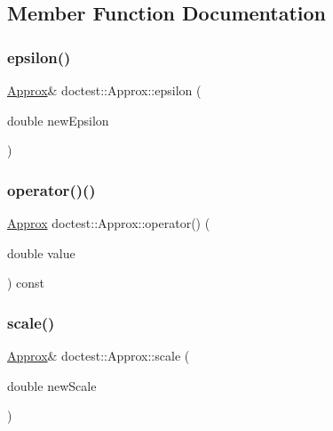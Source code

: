\subsection{Member Function Documentation}
\mbox{\label{classdoctest_1_1Approx_af8df6b0af00fd875e5b6a0c30b86f636}} 
\subsubsection{\texorpdfstring{epsilon()}{epsilon()}}
{\footnotesize\ttfamily \hyperlink{classdoctest_1_1Approx}{Approx}\& doctest\+::\+Approx\+::epsilon (\begin{DoxyParamCaption}\item[{double}]{new\+Epsilon }\end{DoxyParamCaption})}

\mbox{\label{classdoctest_1_1Approx_aae907c5ea1c4ac94e134db9e35da7dce}} 
\subsubsection{\texorpdfstring{operator()()}{operator()()}}
{\footnotesize\ttfamily \hyperlink{classdoctest_1_1Approx}{Approx} doctest\+::\+Approx\+::operator() (\begin{DoxyParamCaption}\item[{double}]{value }\end{DoxyParamCaption}) const}

\mbox{\label{classdoctest_1_1Approx_a62185fd4c09a63dab61bd893574d8473}} 
\subsubsection{\texorpdfstring{scale()}{scale()}}
{\footnotesize\ttfamily \hyperlink{classdoctest_1_1Approx}{Approx}\& doctest\+::\+Approx\+::scale (\begin{DoxyParamCaption}\item[{double}]{new\+Scale }\end{DoxyParamCaption})}



